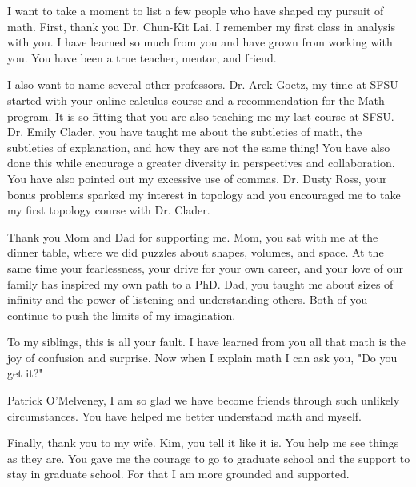 \documentclass{article}
\begin{document}
I want to take a moment to list a few people who have shaped my pursuit of math.  First, thank you Dr. Chun-Kit Lai.  I remember my first class in analysis with you.  I have learned so much from you and have grown from working with you.  You have been a true teacher, mentor, and friend.  

I also want to name several other professors.  Dr. Arek Goetz, my time at SFSU started with your online calculus course and a recommendation for the Math program. It is so fitting that you are also teaching me my last course at SFSU.  Dr. Emily Clader, you have taught me about the subtleties of math, the subtleties of explanation, and how they are not the same thing! You have also done this while encourage a greater diversity in perspectives and collaboration.  You have also pointed out my excessive use of commas.  Dr. Dusty Ross, your bonus problems sparked my interest in topology and you encouraged me to take my first topology course with Dr. Clader.  

Thank you Mom and Dad for supporting me.  Mom, you sat with me at the dinner table, where we did puzzles about shapes, volumes, and space.  At the same time your fearlessness, your drive for your own career, and your love of our family has inspired my own path to a PhD.  Dad, you taught me about sizes of infinity and the power of listening and understanding others.  Both of you continue to push the limits of my imagination. 

To my siblings, this is all your fault.  
I have learned from you all that math is the joy of confusion and surprise.  Now when I explain math I can ask you, "Do you get it?"

Patrick O'Melveney, I am so glad we have become friends through such unlikely circumstances.  You have helped me better understand math and myself.  

Finally, thank you to my wife.  Kim, you tell it like it is.  You help me see things as they are.  You gave me the courage to go to graduate school and the support to stay in graduate school.  For that I am more grounded and supported. 
\end{document}
